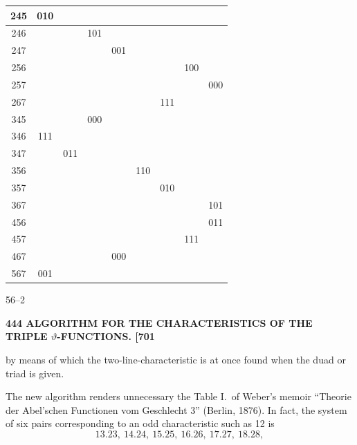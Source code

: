 \documentclass[11pt]{article}
\begin{document}
\begin{center}
\begin{tabular}{|c||c|c|c|c|c|c|c|c|}
245  & 010 &     &     &     &     &     &     &     \\
\hline
246  &     &     & 101 &     &     &     &     &     \\
\hline
247  &     &     &     & 001 &     &     &     &     \\
\hline
256  &     &     &     &     &     &     & 100 &     \\
\hline
257  &     &     &     &     &     &     &     & 000 \\
\hline
267  &     &     &     &     &     & 111 &     &     \\
\hline
345  &     &     & 000 &     &     &     &     &     \\
\hline
346  & 111 &     &     &     &     &     &     &     \\
\hline
347  &     & 011 &     &     &     &     &     &     \\
\hline
356  &     &     &     &     & 110 &     &     &     \\
\hline
357  &     &     &     &     &     & 010 &     &     \\
\hline
367  &     &     &     &     &     &     &     & 101 \\
\hline
456  &     &     &     &     &     &     &     & 011 \\
\hline
457  &     &     &     &     &     &     & 111 &     \\
\hline
467  &     &     &     & 000 &     &     &     &     \\
\hline
567  & 001 &     &     &     &     &     &     &     \\
\hline
\end{tabular}
\end{center}

\hfill 56--2

\bigskip
\noindent\textbf{444 \hfill ALGORITHM FOR THE CHARACTERISTICS OF THE TRIPLE $\vartheta$-FUNCTIONS. \hfill [701}

\medskip

by means of which the two-line-characteristic is at once found when the duad or triad is given.

The new algorithm renders unnecessary the Table I.\ of Weber's memoir ``Theorie der Abel'schen Functionen vom Geschlecht 3'' (Berlin, 1876). In fact, the system of six pairs corresponding to an odd characteristic such as 12 is
\[
13.23,\ 14.24,\ 15.25,\ 16.26,\ 17.27,\ 18.28,
\]
\end{document}
